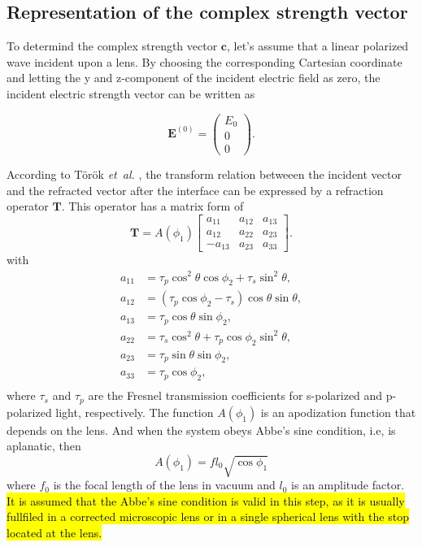 \documentclass[9pt,twocolumn,twoside]{osajnl}
\begin{document}
\subsection{Representation of the complex strength vector}
To determind the complex strength vector $\mathbf{c}$, let's assume that a linear polarized wave incident upon a lens. By choosing the corresponding Cartesian coordinate and letting the y and z-component of the incident electric field as zero, the incident electric strength vector can be written as

\begin{equation}\label{eq:18}
	\mathbf{E}^{(0)}=
	\begin{pmatrix}
		E_0\\
		0\\
		0
	\end{pmatrix}.
\end{equation}

According to T\"or\"ok \emph{et~al.} \cite{torok1995electromagnetic}, the transform relation betweeen the incident vector and the refracted vector after the interface can be expressed by a refraction operator $\mathbf{T}$. This operator has a matrix form of 
	\begin{equation}\label{eq:19}
		\mathbf{T}=A(\phi_1)
		\begin{bmatrix}
			a_{11} & a_{12} & a_{13}\\
			a_{12} & a_{22} & a_{23}\\
			-a_{13} & a_{23} & a_{33}
		\end{bmatrix}.
	\end{equation}	
with
\begin{equation*}
	\begin{aligned}
		a_{11} &= \tau_p\cos^2\theta\cos\phi_2+\tau_s\sin^2\theta,\\
		a_{12} &= (\tau_p\cos\phi_2-\tau_s)\cos\theta\sin\theta,\\
		a_{13} &= \tau_p\cos\theta\sin\phi_2,\\
		a_{22} &= \tau_s\cos^2\theta+\tau_p\cos\phi_2\sin^2\theta,\\
		a_{23} &= \tau_p\sin\theta\sin\phi_2,\\
		a_{33} &= \tau_p\cos\phi_2,\\	
	\end{aligned}	
\end{equation*}
where $\tau_s$ and $\tau_p$ are the Fresnel transmission coefficients for s-polarized and p-polarized light, respectively. The function $A(\phi_1)$ is an apodization function that depends on the lens. And when the system obeys Abbe's sine condition, i.e, is aplanatic, then
\begin{equation}\label{eq:20}
	A(\phi_1)=f l_0\sqrt{\cos\phi_1}
\end{equation}
where $f_0$ is the focal length of the lens in vacuum and $l_0$ is an amplitude factor. \hl{It is assumed that the Abbe's sine condition is valid in this step, as it is usually fullfiled in a corrected microscopic lens or in a single spherical lens with the stop located at the lens.} 
\end{document}

